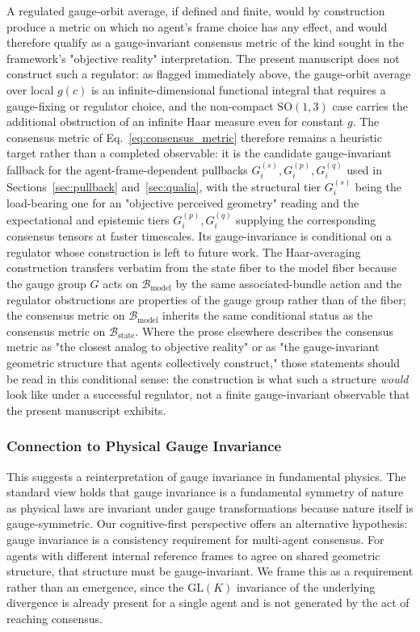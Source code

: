 \documentclass[11pt]{article}
\begin{document}
A regulated gauge-orbit average, if defined and finite, would by construction produce a metric on which no agent's frame choice has any effect, and would therefore qualify as a gauge-invariant consensus metric of the kind sought in the framework's "objective reality" interpretation. The present manuscript does not construct such a regulator: as flagged immediately above, the gauge-orbit average over local $g(c)$ is an infinite-dimensional functional integral that requires a gauge-fixing or regulator choice, and the non-compact $\mathrm{SO}(1,3)$ case carries the additional obstruction of an infinite Haar measure even for constant $g$. The consensus metric of Eq.~\eqref{eq:consensus_metric} therefore remains a heuristic target rather than a completed observable: it is the candidate gauge-invariant fallback for the agent-frame-dependent pullbacks $G_i^{(s)}, G_i^{(p)}, G_i^{(q)}$ used in Sections~\ref{sec:pullback} and~\ref{sec:qualia}, with the structural tier $G_i^{(s)}$ being the load-bearing one for an "objective perceived geometry" reading and the expectational and epistemic tiers $G_i^{(p)}, G_i^{(q)}$ supplying the corresponding consensus tensors at faster timescales. Its gauge-invariance is conditional on a regulator whose construction is left to future work. The Haar-averaging construction transfers verbatim from the state fiber to the model fiber because the gauge group $G$ acts on $\mathcal{B}_{\mathrm{model}}$ by the same associated-bundle action and the regulator obstructions are properties of the gauge group rather than of the fiber; the consensus metric on $\mathcal{B}_{\mathrm{model}}$ inherits the same conditional status as the consensus metric on $\mathcal{B}_{\mathrm{state}}$. Where the prose elsewhere describes the consensus metric as "the closest analog to objective reality" or as "the gauge-invariant geometric structure that agents collectively construct," those statements should be read in this conditional sense: the construction is what such a structure \emph{would} look like under a successful regulator, not a finite gauge-invariant observable that the present manuscript exhibits.

\subsubsection{Connection to Physical Gauge Invariance}

This suggests a reinterpretation of gauge invariance in fundamental physics. The standard view holds that gauge invariance is a fundamental symmetry of nature as physical laws are invariant under gauge transformations because nature itself is gauge-symmetric. Our cognitive-first perspective offers an alternative hypothesis: gauge invariance is a consistency requirement for multi-agent consensus. For agents with different internal reference frames to agree on shared geometric structure, that structure must be gauge-invariant. We frame this as a requirement rather than an emergence, since the $\mathrm{GL}(K)$ invariance of the underlying divergence is already present for a single agent and is not generated by the act of reaching consensus.
\end{document}
